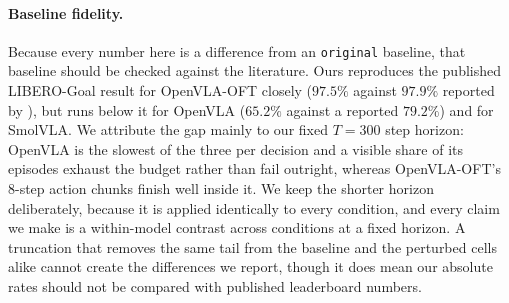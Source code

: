 \documentclass[11pt]{article}
\begin{document}
\paragraph{Baseline fidelity.} Because every number here is a difference from an
\texttt{original} baseline, that baseline should be checked against the literature.
Ours reproduces the published LIBERO-Goal result for OpenVLA-OFT closely ($97.5\%$
against $97.9\%$ reported by \citet{kim2025oft}), but runs below it for OpenVLA
($65.2\%$ against a reported $79.2\%$) and for SmolVLA. We attribute the gap mainly to
our fixed $T=300$ step horizon: OpenVLA is the slowest of the three per decision and
a visible share of its episodes exhaust the budget rather than fail outright, whereas
OpenVLA-OFT's 8-step action chunks finish well inside it. We keep the shorter horizon
deliberately, because it is applied identically to every condition, and every claim we
make is a within-model contrast across conditions at a fixed horizon. A truncation
that removes the same tail from the baseline and the perturbed cells alike cannot
create the differences we report, though it does mean our absolute rates should not be
compared with published leaderboard numbers.
\end{document}
